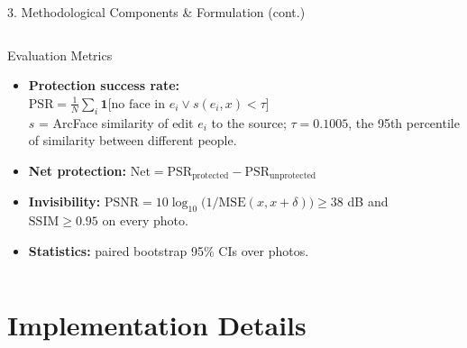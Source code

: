 \documentclass[aspectratio=169, 11pt]{beamer}
\begin{document}
\begin{frame}{3. Methodological Components \& Formulation (cont.)}
\begin{columns}[T]
        \begin{block}{Evaluation Metrics}
            \scriptsize
            \begin{itemize}
                \item \textbf{Protection success rate:}\\
                \mbox{$\mathrm{PSR}=\frac{1}{N}\sum_{i}\mathbf{1}\big[\text{no face in } e_i \lor s(e_i,x)<\tau\big]$}\\
                $s$ = ArcFace similarity of edit $e_i$ to the source; $\tau=0.1005$, the 95th percentile of similarity between different people.
                \item \textbf{Net protection:} $\mathrm{Net}=\mathrm{PSR}_{\text{protected}}-\mathrm{PSR}_{\text{unprotected}}$
                \item \textbf{Invisibility:} $\mathrm{PSNR}=10\log_{10}\big(1/\mathrm{MSE}(x,x+\delta)\big)\ge 38$ dB and $\mathrm{SSIM}\ge0.95$ on every photo.
                \item \textbf{Statistics:} paired bootstrap 95\% CIs over photos.
            \end{itemize}
        \end{block}
    \end{columns}
\end{frame}

\section{Implementation Details}
\end{document}
